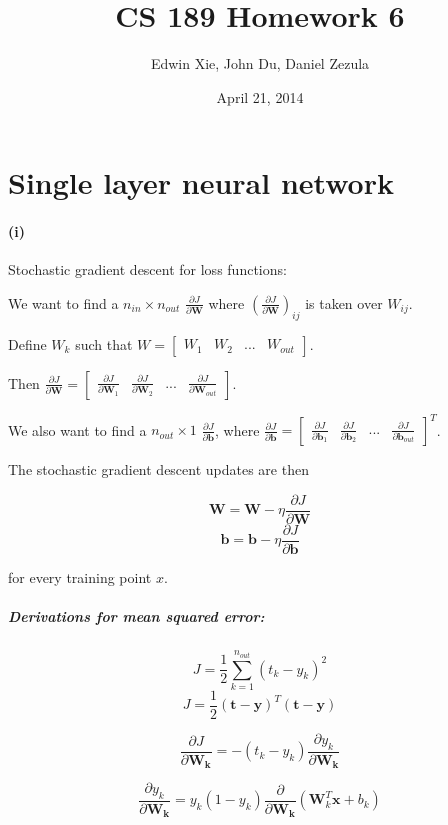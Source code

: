 \documentclass{article}
\title{CS 189 Homework 6}
\author{Edwin Xie, John Du, Daniel Zezula}
\date{April 21, 2014}
\begin{document}
\maketitle

\section*{Single layer neural network}

\paragraph{(i)} Stochastic gradient descent for loss functions:

We want to find a $n_{in} \times n_{out}$ $\frac{\partial{J}}{\partial{\mathbf{W}}}$
where $(\frac{\partial{J}}{\partial{\mathbf{W}}})_{ij}$ is taken over $W_{ij}$.

Define $W_k$ such that $W = \begin{bmatrix} W_1 & W_2 & ... & W_{out} \end{bmatrix}$.

Then $\frac{\partial{J}}{\partial{\mathbf{W}}} =
\begin{bmatrix}\frac{\partial{J}}{\partial{\mathbf{W}_1}} &
\frac{\partial{J}}{\partial{\mathbf{W}_2}} & ... &
\frac{\partial{J}}{\partial{\mathbf{W}_{out}}} \end{bmatrix}$.

We also want to find a $n_{out} \times 1$ $\frac{\partial{J}}{\partial{\mathbf{b}}}$,
where $\frac{\partial{J}}{\partial{\mathbf{b}}} =
\begin{bmatrix} \frac{\partial{J}}{\partial{\mathbf{b}_1}} &
\frac{\partial{J}}{\partial{\mathbf{b}_2}} & ... &
\frac{\partial{J}}{\partial{\mathbf{b}_{out}}} \end{bmatrix}^T$.

The stochastic gradient descent updates are then

$$\mathbf{W} = \mathbf{W} - \eta \dfrac{\partial{J}}{\partial{\mathbf{W}}}$$
$$\mathbf{b} = \mathbf{b} - \eta \dfrac{\partial{J}}{\partial{\mathbf{b}}}$$

for every training point $x$.
\subparagraph{Derivations for mean squared error:}
$$J = \dfrac{1}{2}\sum_{k=1}^{n_{out}}(t_k - y_k)^{2}$$
$$J = \dfrac{1}{2}(\mathbf{t} - \mathbf{y})^{T}(\mathbf{t} - \mathbf{y})$$


$$\dfrac{\partial{J}}{\partial{\mathbf{W_k}}} = -(t_k - y_k) \dfrac{\partial{y_k}}{\partial{\mathbf{W_k}}}$$

$$\dfrac{\partial{y_k}}{\partial{\mathbf{W_k}}} = y_k(1 - y_k)
\dfrac{\partial}{\partial{\mathbf{W_k}}}(\mathbf{W}_k^T \mathbf{x} + b_k)$$
\end{document}
